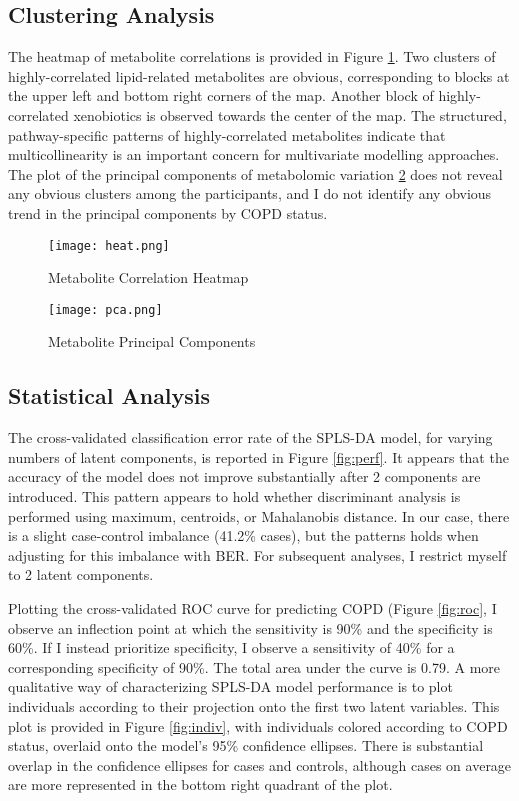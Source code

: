 \documentclass{article}
\begin{document}
\subsection*{Clustering Analysis}
The heatmap of metabolite correlations is provided in Figure \ref{fig:heat}. Two clusters of highly-correlated lipid-related metabolites are obvious, corresponding to blocks at the upper left and bottom right corners of the map. Another block of highly-correlated xenobiotics is observed towards the center of the map. The structured, pathway-specific patterns of highly-correlated metabolites indicate that multicollinearity is an important concern for multivariate modelling approaches. The plot of the principal components of metabolomic variation \ref{fig:pca} does not reveal any obvious clusters among the participants, and I do not identify any obvious trend in the principal components by COPD status.

\begin{figure}
  \centering
  \caption{Metabolite Correlation Heatmap}
  \texttt{[image: heat.png]}
  \label{fig:heat}
  \end{figure}

\begin{figure}
  \caption{Metabolite Principal Components}
  \texttt{[image: pca.png]}
  \centering
  \label{fig:pca}
  \end{figure}

\subsection*{Statistical Analysis}

The cross-validated classification error rate of the SPLS-DA model, for varying numbers of latent components, is reported in Figure \ref{fig:perf}. It appears that the accuracy of the model does not improve substantially after 2 components are introduced. This pattern appears to hold whether discriminant analysis is performed using maximum, centroids, or Mahalanobis distance. In our case, there is a slight case-control imbalance (41.2\% cases), but the patterns holds when adjusting for this imbalance with BER. For subsequent analyses, I restrict myself to 2 latent components.

Plotting the cross-validated ROC curve for predicting COPD (Figure \ref{fig:roc}, I observe an inflection point at which the sensitivity is 90\% and the specificity is 60\%. If I instead prioritize specificity, I observe a sensitivity of 40\% for a corresponding specificity of 90\%. The total area under the curve is 0.79. A more qualitative way of characterizing SPLS-DA model performance is to plot individuals according to their projection onto the first two latent variables. This plot is provided in Figure \ref{fig:indiv}, with individuals colored according to COPD status, overlaid onto the model's 95\% confidence ellipses. There is substantial overlap in the confidence ellipses for cases and controls, although cases on average are more represented in the bottom right quadrant of the plot.
\end{document}
